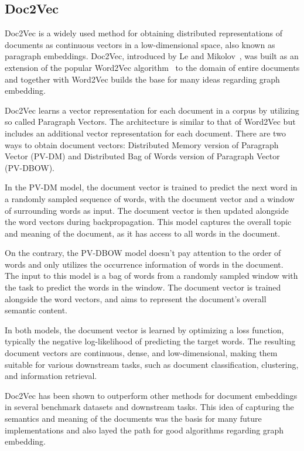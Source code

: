 \subsection{Doc2Vec}
Doc2Vec is a widely used method for obtaining distributed representations of documents as continuous vectors in a low-dimensional space, also known as paragraph embeddings. Doc2Vec, introduced by Le and Mikolov~\cite{2014doc2vec}, was built as an extension of the popular Word2Vec algorithm~\cite{mikolov2013distributed} to the domain of entire documents and together with Word2Vec builds the base for many ideas regarding graph embedding.

Doc2Vec learns a vector representation for each document in a corpus by utilizing so called Paragraph Vectors. The architecture is similar to that of Word2Vec but includes an additional vector representation for each document. There are two ways to obtain document vectors: Distributed Memory version of Paragraph Vector (PV-DM) and Distributed Bag of Words version of Paragraph Vector (PV-DBOW).

In the PV-DM model, the document vector is trained to predict the next word in a randomly sampled sequence of words, with the document vector and a window of surrounding words as input. The document vector is then updated alongside the word vectors during backpropagation. This model captures the overall topic and meaning of the document, as it has access to all words in the document.

On the contrary, the PV-DBOW model doesn't pay attention to the order of words and only utilizes the occurrence information of words in the document. The input to this model is a bag of words from a randomly sampled window with the task to predict the words in the window. The document vector is trained alongside the word vectors, and  aims to represent the document's overall semantic content.

In both models, the document vector is learned by optimizing a loss function, typically the negative log-likelihood of predicting the target words. The resulting document vectors are continuous, dense, and low-dimensional, making them suitable for various downstream tasks, such as document classification, clustering, and information retrieval.

Doc2Vec has been shown to outperform other methods for document embeddings in several benchmark datasets and downstream tasks. This idea of capturing the semantics and meaning of the documents was the basis for many future implementations and also layed the path for good algorithms regarding graph embedding.

